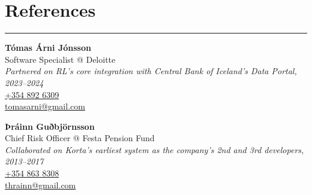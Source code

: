 \documentclass[a4paper,10pt]{article}
\newcommand{\cvheading}[1]{%
  {\headingfont\section*{#1}}
  \vspace{-0.2cm}
  \hrule
  \vspace{0.2cm}
}
\begin{document}
\cvheading{References}
\begin{multicols}{2}
\raggedright
\textbf{Tómas Árni Jónsson}\\[0.2cm]
Software Specialist @ Deloitte\\[0.4cm]
\textit{Partnered on RL's core integration with Central Bank of Iceland's Data Portal, 2023--2024}\\[0.4cm]
\href{tel:+3548926309}{{\color{accent}\faPhone\hspace{0.3em}+354 892 6309}}\\[0.4cm]
\href{mailto:tomasarni@gmail.com}{{\color{accent}\faEnvelope\hspace{0.3em}tomasarni@gmail.com}}

\columnbreak

\textbf{Þráinn Guðbjörnsson}\\[0.2cm]
Chief Risk Officer @ Festa Pension Fund\\[0.4cm]
\textit{Collaborated on Korta's earliest system as the company's 2nd and 3rd developers, 2013--2017}\\[0.4cm]
\href{tel:+3548638308}{{\color{accent}\faPhone\hspace{0.3em}+354 863 8308}}\\[0.4cm]
\href{mailto:thrainn@gmail.com}{{\color{accent}\faEnvelope\hspace{0.3em}thrainn@gmail.com}}
\end{multicols}
\end{document}
